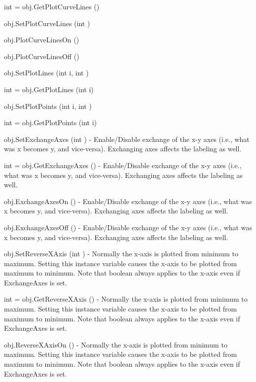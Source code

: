 \begin{DoxyItemize}
\item {\ttfamily int = obj.\-Get\-Plot\-Curve\-Lines ()}  
\item {\ttfamily obj.\-Set\-Plot\-Curve\-Lines (int )}  
\item {\ttfamily obj.\-Plot\-Curve\-Lines\-On ()}  
\item {\ttfamily obj.\-Plot\-Curve\-Lines\-Off ()}  
\item {\ttfamily obj.\-Set\-Plot\-Lines (int i, int )}  
\item {\ttfamily int = obj.\-Get\-Plot\-Lines (int i)}  
\item {\ttfamily obj.\-Set\-Plot\-Points (int i, int )}  
\item {\ttfamily int = obj.\-Get\-Plot\-Points (int i)}  
\item {\ttfamily obj.\-Set\-Exchange\-Axes (int )} -\/ Enable/\-Disable exchange of the x-\/y axes (i.\-e., what was x becomes y, and vice-\/versa). Exchanging axes affects the labeling as well.  
\item {\ttfamily int = obj.\-Get\-Exchange\-Axes ()} -\/ Enable/\-Disable exchange of the x-\/y axes (i.\-e., what was x becomes y, and vice-\/versa). Exchanging axes affects the labeling as well.  
\item {\ttfamily obj.\-Exchange\-Axes\-On ()} -\/ Enable/\-Disable exchange of the x-\/y axes (i.\-e., what was x becomes y, and vice-\/versa). Exchanging axes affects the labeling as well.  
\item {\ttfamily obj.\-Exchange\-Axes\-Off ()} -\/ Enable/\-Disable exchange of the x-\/y axes (i.\-e., what was x becomes y, and vice-\/versa). Exchanging axes affects the labeling as well.  
\item {\ttfamily obj.\-Set\-Reverse\-X\-Axis (int )} -\/ Normally the x-\/axis is plotted from minimum to maximum. Setting this instance variable causes the x-\/axis to be plotted from maximum to minimum. Note that boolean always applies to the x-\/axis even if Exchange\-Axes is set.  
\item {\ttfamily int = obj.\-Get\-Reverse\-X\-Axis ()} -\/ Normally the x-\/axis is plotted from minimum to maximum. Setting this instance variable causes the x-\/axis to be plotted from maximum to minimum. Note that boolean always applies to the x-\/axis even if Exchange\-Axes is set.  
\item {\ttfamily obj.\-Reverse\-X\-Axis\-On ()} -\/ Normally the x-\/axis is plotted from minimum to maximum. Setting this instance variable causes the x-\/axis to be plotted from maximum to minimum. Note that boolean always applies to the x-\/axis even if Exchange\-Axes is set.  

\end{DoxyItemize}
